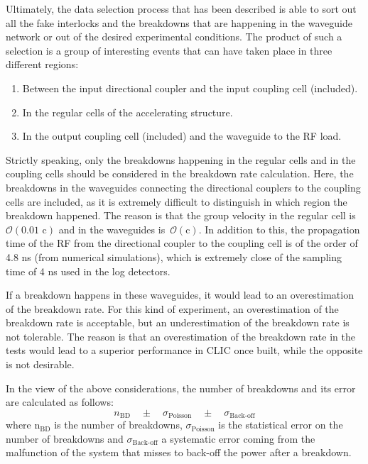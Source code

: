 Ultimately, the data selection process that has been described is able to sort out all the fake interlocks and the breakdowns that are happening in the waveguide network or out of the desired experimental conditions. The product of such a selection is a group of interesting events that can have taken place in three different regions:
\begin{enumerate}
\item Between the input directional coupler and the input coupling cell (included).
\item In the regular cells of the accelerating structure.
\item In the output coupling cell (included) and the waveguide to the RF load.
\end{enumerate}
Strictly speaking, only the breakdowns happening in the regular cells and in the coupling cells should be considered in the breakdown rate calculation. Here, the breakdowns in the waveguides connecting the directional couplers to the coupling cells are included, as it is extremely difficult to distinguish in which region the breakdown happened. The reason is that the group velocity in the regular cell is $\mathcal{O}(\text{0.01 c})$ and in the waveguides is~$\mathcal{O}(\text{c})$. In addition to this, the propagation time of the RF from the directional coupler to the coupling cell is of the order of 4.8 ns (from numerical simulations), which is extremely close of the sampling time of 4 ns used in the log detectors. 

If a breakdown happens in these waveguides, it would lead to an overestimation of the breakdown rate. For this kind of experiment, an overestimation of the breakdown rate is acceptable, but an underestimation of the breakdown rate is not tolerable. The reason is that an overestimation of the breakdown rate in the tests would lead to a superior performance in CLIC once built, while the opposite is not desirable.   

In the view of the above considerations, the number of breakdowns and its error are calculated as follows:
\begin{equation}
n_{\text{BD}} \quad \pm \quad \sigma_{\text{Poisson}} \quad \pm \quad \sigma_{\text{Back-off}} 
\label{numBD}
\end{equation}
where  n$_{\text{BD}}$ is the number of breakdowns, $\sigma_{\text{Poisson}}$ is the statistical error on the number of breakdowns and $\sigma_{\text{Back-off}}$ a systematic error coming from the malfunction of the system that misses to back-off the power after a breakdown.

